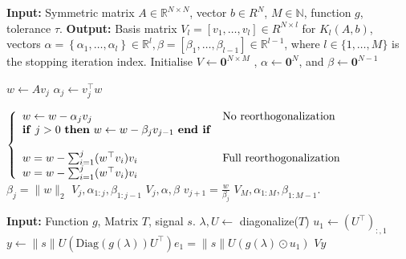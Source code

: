 \documentclass[11pt]{article}
\renewcommand{\mathbb}[1]{\mathds{#1}}
\newcommand{\R}{\mathbb{R}}
\newcommand{\N}{\mathbb{N}}
\renewcommand{\L}{\mathcal{L}}
\theoremstyle{definition}
\theoremstyle{remark}
\theoremstyle{experimental}
\begin{document}
\begin{algorithm}[ht!]
  \caption{Modified Lanczos method in floating point arithmetic.}
  \label{alg:lanczos}
  \begin{algorithmic}[1]
    \State \textbf{Input:} Symmetric matrix $ A \in \R^{N\times N}$, vector $ b \in R^N $, $ M \in
    \N $, function $ g $, tolerance $ \tau $.
    \State \textbf{Output: } Basis matrix $ V_l = \left[ v_1,\dots,v_l \right] \in R^{N \times l} $ for $ K_l(A,b) $, vectors $
    \alpha =\left\{ \alpha_1,\dots,\alpha_l \right\} \in \R^l, \beta=\left[ \beta_1,\dots,\beta_{l-1} \right] \in \R^{l-1} $, where $ l \in
    \{ 1,\dots,M \}$ is the stopping iteration index.
    \State Initialise $ V \leftarrow \mathbf{0}^{N \times M} $ , $ \alpha \leftarrow \mathbf{0}^N $,
    and $ \beta \leftarrow \mathbf{0}^{N-1}$

    \State $ w \leftarrow Av_j  $
    \State $ \alpha_j \leftarrow v_j^{\top} w $

    \State $\left\{
    \begin{array}{ll}
        w \leftarrow w - \alpha_j v_j&  \text{No reorthogonalization} \\
        \text{\textbf{if} } j>0 \text{ \textbf{then} } w \leftarrow w - \beta_j v_{j-1}\text{ \textbf{end
    if}} & \\ \\
        w = w - \sum_{i=1}^j (w^{\top}v_i)v_i & \text{Full reorthogonalization} \\
        w = w - \sum_{i=1}^j (w^{\top}v_i)v_i 
    \end{array}
    \right.$
    \State $ \beta_j = \|w\|_2 $
      \State 
      \Return $ V_j, \alpha_{1:j}, \beta_{1:j-1} $
    \Else
      \State 
      \Return $ V_j, \alpha, \beta $
      \EndIf
      \State $ v_{j+1} = \frac{w}{\beta_j} $
    \EndIf
    \EndIf
    \EndFor
    \State \Return $ V_M, \alpha_{1:M}, \beta_{1:M-1} $.
  \end{algorithmic}
  
\end{algorithm}

\begin{algorithm}[ht!]
  \caption{Approximation of $ g(\L)s $ using Lanczos.}
  \label{alg:g_evaluation}
  \begin{algorithmic}
    \State \textbf{Input:} Function $ g $, Matrix $ T $, signal $ s $.
    \State $ \lambda, U \leftarrow $ diagonalize($ T $)  
    \State $ u_1 \leftarrow  (U^{\top})_{:,1}$
    \State $y \leftarrow \|s\| U (\text{Diag}(g(\lambda)) U^{\top})e_1 = \|s\| U (g(\lambda) \odot u_1)$
    \State {}
    \State \Return $ Vy $
  \end{algorithmic}
\end{algorithm}
\end{document}
